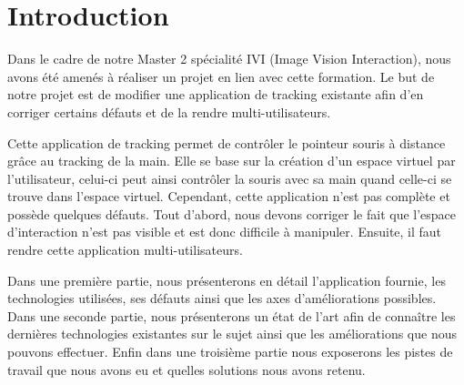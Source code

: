 \chapter{Introduction}
Dans le cadre de notre Master 2 spécialité IVI (Image Vision Interaction), nous avons été amenés à réaliser un projet en lien avec cette formation. Le but de notre projet est de modifier une application de tracking existante afin d’en corriger certains défauts et de la rendre multi-utilisateurs. 

Cette application de tracking permet de contrôler le pointeur souris à distance grâce au tracking de la main. Elle se base sur la création d’un espace virtuel par l’utilisateur, celui-ci peut ainsi contrôler la souris avec sa main quand celle-ci se trouve dans l’espace virtuel. Cependant, cette application n’est pas complète et possède quelques défauts. Tout d’abord, nous devons corriger le fait que l’espace d'interaction n’est pas visible et est donc difficile à manipuler. Ensuite, il faut rendre cette application multi-utilisateurs. 
	
Dans une première partie, nous présenterons en détail l’application fournie, les technologies utilisées, ses défauts ainsi que les axes d’améliorations possibles. Dans une seconde partie, nous présenterons un état de l’art afin de connaître les dernières technologies existantes sur le sujet ainsi que les améliorations que nous pouvons effectuer. Enfin dans une troisième partie nous exposerons les pistes de travail que nous avons eu et quelles solutions nous avons retenu.
